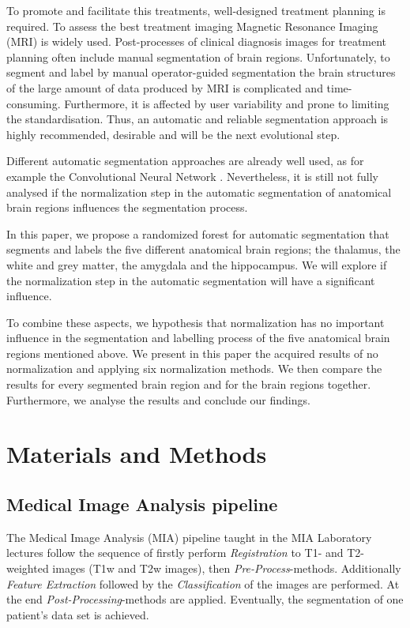 \documentclass[article]{IEEEtran}
\begin{document}
	
	To promote and facilitate this treatments, well-designed treatment planning is required.
	To assess the best treatment imaging Magnetic Resonance Imaging (MRI) is widely used. 
	Post-processes of clinical diagnosis images for treatment planning often include manual segmentation of brain regions. 
	Unfortunately, to segment and label by manual operator-guided segmentation the brain structures of the large amount of data produced by MRI is complicated and time-consuming. 
	Furthermore, it is affected by user variability and prone to limiting the standardisation. 
	Thus, an automatic and reliable segmentation approach is highly recommended, desirable and will be the next evolutional step. \cite{Pereira2016} \cite{Brebisson2015}


	Different automatic segmentation approaches are already well used, as for example the Convolutional Neural Network \cite{Pereira2016}.
	Nevertheless, it is still not fully analysed if the normalization step in the automatic segmentation of anatomical brain regions influences the segmentation process.
	
	
	In this paper, we propose a randomized forest for automatic segmentation that segments and labels the five different anatomical brain regions; the thalamus, the white and grey matter, the amygdala and the hippocampus. We will explore if the normalization step in the automatic segmentation will have a significant influence. 
	
	
	To combine these aspects, we hypothesis that normalization has no important influence in the segmentation and labelling process of the five anatomical brain regions mentioned above. 
	We present in this paper the acquired results of no normalization and applying six normalization methods. 
	We then compare the results for every segmented brain region and for the brain regions together. 
	Furthermore, we analyse the results and conclude our findings. 



\section{Materials and Methods}

\subsection{Medical Image Analysis pipeline}
	The Medical Image Analysis (MIA) pipeline taught in the MIA Laboratory lectures follow the sequence of firstly perform {\itshape Registration} to T1- and T2-weighted images (T1w and T2w images), then {\itshape Pre-Process}-methods. Additionally {\itshape Feature Extraction} followed by the {\itshape Classification} of the images are performed. 
	At the end {\itshape Post-Processing}-methods are applied. Eventually, the segmentation of one patient's data set is achieved. 
\end{document}
